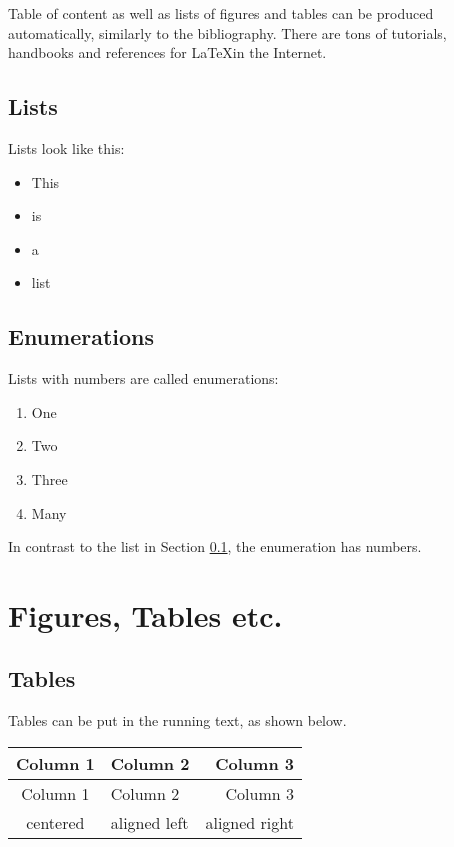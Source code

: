 \documentclass[12pt,leqno,a4paper]{article}
\begin{document}
Table of content as well as lists of figures and tables can be produced automatically, similarly to the bibliography. There are tons of tutorials, handbooks and references for \LaTeX in the Internet. 

\subsection{Lists}\label{listen}

Lists look like this:

\begin{itemize}
\item This 
\item is 
\item  a 
\item list 
\end{itemize}


\subsection{Enumerations}

Lists with numbers are called enumerations:

\begin{enumerate}
\item One
\item Two
\item Three 
\item Many
\end{enumerate}

In contrast to the list in Section \ref{listen}, the enumeration has numbers.


\section{Figures, Tables etc.}

\subsection{Tables}

Tables can be put in the running text, as shown below.

\begin{tabular}{clr}
\toprule
Column 1 & Column 2 & Column 3\\
\midrule
Column 1 & Column 2 & Column 3 \\
centered & aligned left &  aligned right \\
\bottomrule
\end{tabular}
\end{document}
